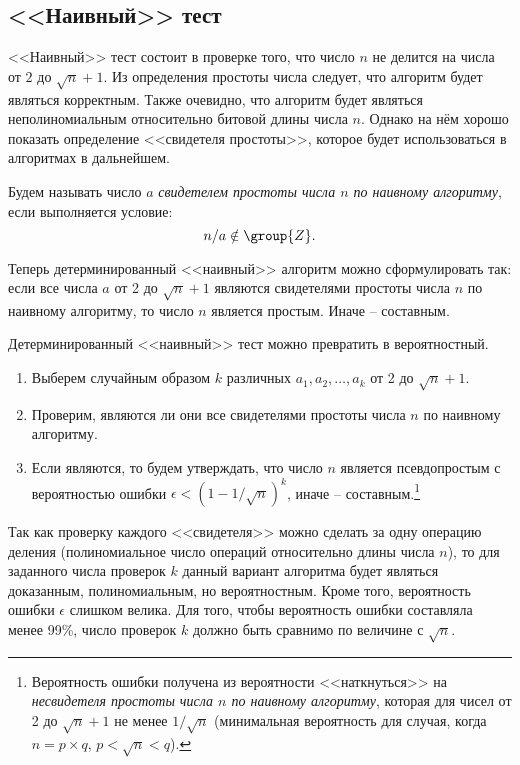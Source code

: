 \subsection{<<Наивный>> тест}\label{section-prime-check-naive}

<<Наивный>> тест состоит в проверке того, что число $n$ не делится на числа от $2$ до $\sqrt{n}+1$. Из определения простоты числа следует, что алгоритм будет являться корректным. Также очевидно, что алгоритм будет являться неполиномиальным относительно битовой длины числа $n$. Однако на нём хорошо показать определение <<свидетеля простоты>>, которое будет использоваться в алгоритмах в дальнейшем.

Будем называть число $a$ \emph{свидетелем простоты числа $n$ по наивному алгоритму}, если выполняется условие:
\[
	n / a \notin \group{Z}.
\]

Теперь детерминированный <<наивный>> алгоритм можно сформулировать так: если все числа $a$ от 2 до $\sqrt{n}+1$ являются свидетелями простоты числа $n$ по наивному алгоритму, то число $n$ является простым. Иначе -- составным.

Детерминированный <<наивный>> тест можно превратить в вероятностный.

\begin{enumerate}
	\item Выберем случайным образом $k$ различных $a_1, a_2, \dots, a_k$ от 2 до $\sqrt{n}+1$.
	\item Проверим, являются ли они все свидетелями простоты числа $n$ по наивному алгоритму. 
	\item Если являются, то будем утверждать, что число $n$ является псевдопростым с вероятностью ошибки $\epsilon < \left( 1 - 1 / \sqrt{n} \right)^k$, иначе -- составным.\footnote{Вероятность ошибки получена из вероятности <<наткнуться>> на \emph{несвидетеля простоты числа $n$ по наивному алгоритму}, которая для чисел от 2 до $\sqrt{n}+1$ не менее $1 / \sqrt{n}$ (минимальная вероятность для случая, когда $n = p \times q$, $p < \sqrt{n} < q$).}
\end{enumerate}

Так как проверку каждого <<свидетеля>> можно сделать за одну операцию деления (полиномиальное число операций относительно длины числа $n$), то для заданного числа проверок $k$ данный вариант алгоритма будет являться доказанным, полиномиальным, но вероятностным. Кроме того, вероятность ошибки $\epsilon$ слишком велика. Для того, чтобы вероятность ошибки составляла менее 99\%, число проверок $k$ должно быть сравнимо по величине с $\sqrt{n}$.
